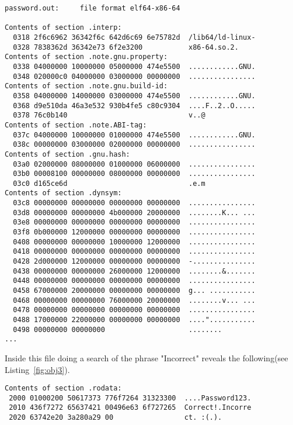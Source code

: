 \documentclass[final,5p,times,authoryear]{elsarticle}
\begin{document}
\begin{lstlisting}[captionpos=b, caption={Snippet showing the output of the object disassembly.},label={fig:obj2},style=codeBash]
password.out:     file format elf64-x86-64

Contents of section .interp:
  0318 2f6c6962 36342f6c 642d6c69 6e75782d  /lib64/ld-linux-
  0328 7838362d 36342e73 6f2e3200           x86-64.so.2.    
Contents of section .note.gnu.property:
  0338 04000000 10000000 05000000 474e5500  ............GNU.
  0348 020000c0 04000000 03000000 00000000  ................
Contents of section .note.gnu.build-id:
  0358 04000000 14000000 03000000 474e5500  ............GNU.
  0368 d9e510da 46a3e532 930b4fe5 c80c9304  ....F..2..O.....
  0378 76c0b140                             v..@            
Contents of section .note.ABI-tag:
  037c 04000000 10000000 01000000 474e5500  ............GNU.
  038c 00000000 03000000 02000000 00000000  ................
Contents of section .gnu.hash:
  03a0 02000000 08000000 01000000 06000000  ................
  03b0 00008100 00000000 08000000 00000000  ................
  03c0 d165ce6d                             .e.m            
Contents of section .dynsym:
  03c8 00000000 00000000 00000000 00000000  ................
  03d8 00000000 00000000 4b000000 20000000  ........K... ...
  03e8 00000000 00000000 00000000 00000000  ................
  03f8 0b000000 12000000 00000000 00000000  ................
  0408 00000000 00000000 10000000 12000000  ................
  0418 00000000 00000000 00000000 00000000  ................
  0428 2d000000 12000000 00000000 00000000  -...............
  0438 00000000 00000000 26000000 12000000  ........&.......
  0448 00000000 00000000 00000000 00000000  ................
  0458 67000000 20000000 00000000 00000000  g... ...........
  0468 00000000 00000000 76000000 20000000  ........v... ...
  0478 00000000 00000000 00000000 00000000  ................
  0488 17000000 22000000 00000000 00000000  ...."...........
  0498 00000000 00000000                    ........        
...
\end{lstlisting}

Inside this file doing a search of the phrase "Incorrect" reveals the following(see Listing~\ref{fig:obj3}).

\begin{lstlisting}[captionpos=b, caption={Snippet showing the block containing the phrase "Incorrect".},label={fig:obj3},style=codeBash]
Contents of section .rodata:
 2000 01000200 50617373 776f7264 31323300  ....Password123.
 2010 436f7272 65637421 00496e63 6f727265  Correct!.Incorre
 2020 63742e20 3a280a29 00                 ct. :(.).       
\end{lstlisting}
\end{document}
